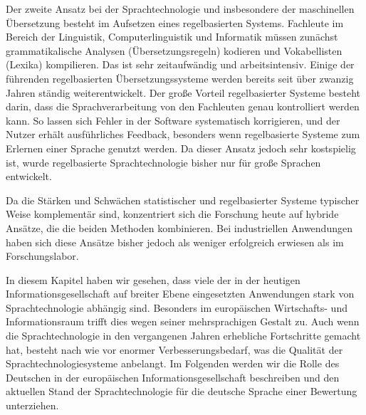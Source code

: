 \documentclass[]{../../metanetpaper}
\begin{document}
\begin{Parallel}[c]{79mm}{78mm}
{Der zweite Ansatz bei der Sprachtechnologie und insbesondere der maschinellen Übersetzung besteht im Aufsetzen eines regelbasierten Systems. Fachleute im Bereich der Linguistik, Computerlinguistik und Informatik müssen zunächst grammatikalische Analysen (Übersetzungsregeln) kodieren und Vokabellisten (Lexika) kompilieren. Das ist sehr zeitaufwändig und arbeitsintensiv. Einige der führenden regelbasierten Übersetzungssysteme werden bereits seit über zwanzig Jahren ständig weiterentwickelt. Der große Vorteil regelbasierter Systeme besteht darin, dass die Sprachverarbeitung von den Fachleuten genau kontrolliert werden kann. So lassen sich Fehler in der Software systematisch korrigieren, und der Nutzer erhält ausführliches Feedback, besonders wenn regelbasierte Systeme zum Erlernen einer Sprache genutzt werden. Da dieser Ansatz jedoch sehr kostspielig ist, wurde regelbasierte Sprachtechnologie bisher nur für große Sprachen entwickelt. 

Da die Stärken und Schwächen statistischer und regelbasierter Systeme typischer Weise komplementär sind, konzentriert sich die Forschung heute auf hybride Ansätze, die die beiden Methoden kombinieren. Bei industriellen Anwendungen haben sich diese Ansätze bisher jedoch als weniger erfolgreich erwiesen als im Forschungslabor. 

In diesem Kapitel haben wir gesehen, dass viele der in der heutigen Informationsgesellschaft auf breiter Ebene eingesetzten Anwendungen stark von Sprachtechnologie abhängig sind. Besonders im europäischen Wirtschafts- und Informationsraum trifft dies wegen seiner mehrsprachigen Gestalt zu. Auch wenn die Sprachtechnologie in den vergangenen Jahren erhebliche Fortschritte gemacht hat, besteht nach wie vor enormer Verbesserungsbedarf, was die Qualität der Sprachtechnologiesysteme anbelangt. Im Folgenden werden wir die Rolle des Deutschen in der europäischen Informationsgesellschaft beschreiben und den aktuellen Stand der Sprachtechnologie für die deutsche Sprache einer Bewertung unterziehen.
  }

\end{Parallel}
\end{document}
